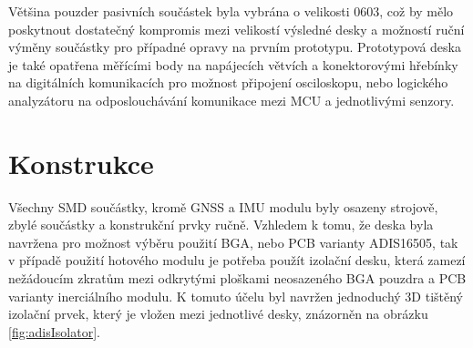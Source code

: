 Většina pouzder pasivních součástek byla vybrána o velikosti 0603, což by mělo poskytnout dostatečný kompromis mezi velikostí výsledné desky a možností ruční výměny součástky pro případné opravy na prvním prototypu. Prototypová deska je také opatřena měřícími body na napájecích větvích a konektorovými hřebínky na digitálních komunikacích pro možnost připojení osciloskopu, nebo logického analyzátoru na odposlouchávání komunikace mezi \ac{MCU} a jednotlivými senzory. 

\section{Konstrukce}

Všechny SMD součástky, kromě \ac{GNSS} a \ac{IMU} modulu byly osazeny strojově, zbylé součástky a konstrukční prvky ručně. Vzhledem k tomu, že deska byla navržena pro možnost výběru použití BGA, nebo PCB varianty ADIS16505, tak v případě použití hotového modulu je potřeba použít izolační desku, která zamezí nežádoucím zkratům mezi odkrytými ploškami neosazeného BGA pouzdra a PCB varianty inerciálního modulu. K tomuto účelu byl navržen jednoduchý 3D tištěný izolační prvek, který je vložen mezi jednotlivé desky, znázorněn na obrázku \ref{fig:adisIsolator}.


